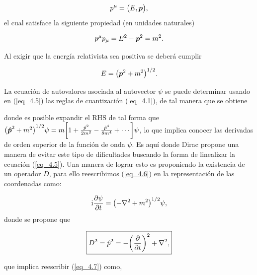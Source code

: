 \begin{equation}
	p^\mu = \qty\big(E,\vb*{p}),
\end{equation}
el cual satisface la siguiente propiedad (en unidades naturales)

\begin{equation}
	p^\mu p_\mu = E^2 - \vb*{p}^2 = m^2.
	\label{eq_4.4}
\end{equation}

Al exigir que la energía relativista sea positiva se deberá cumplir 

\begin{equation}
	E = \qty\big( \vb*{p}^2 + m^2 )^{1/2}.
	\label{eq_4.5}
\end{equation}

La ecuación de autovalores asociada al autovector $\psi$ se puede determinar usando en (\ref{eq_4.5}) las reglas de cuantización (\ref{eq_4.1}), de tal manera que se obtiene


donde es posible expandir el RHS de tal forma que $\qty\big( \vb*{\hat{p}}^2 + m^2 )^{1/2} \psi = m \qty\bigg[ 1 + \frac{\hat{p}^2}{2m^2} - \frac{\hat{p}^4}{8m^4} + \cdots ]\psi$, lo que implica conocer las derivadas de orden superior de la función de onda $\psi$. Es aquí donde Dirac propone una manera de evitar este tipo de dificultades buscando la forma de linealizar la ecuación (\ref{eq_4.5}). Una manera de lograr esto es proponiendo la existencia de un operador $D$, para ello reescribimos (\ref{eq_4.6}) en la representación de las coordenadas como:

\begin{equation}
	\ii \pdv{\psi}{t} = \qty( -\laplacian + m^2 )^{1/2} \psi ,
	\label{eq_4.7}
\end{equation}
donde se propone que 
\newcommand{\OD}{D}

\begin{equation}
	\boxed{
	\OD^2 = \Op^2 = -\qty( \pdv{t} )^2 + \laplacian, }
\end{equation}

que implica reescribir (\ref{eq_4.7}) como,


